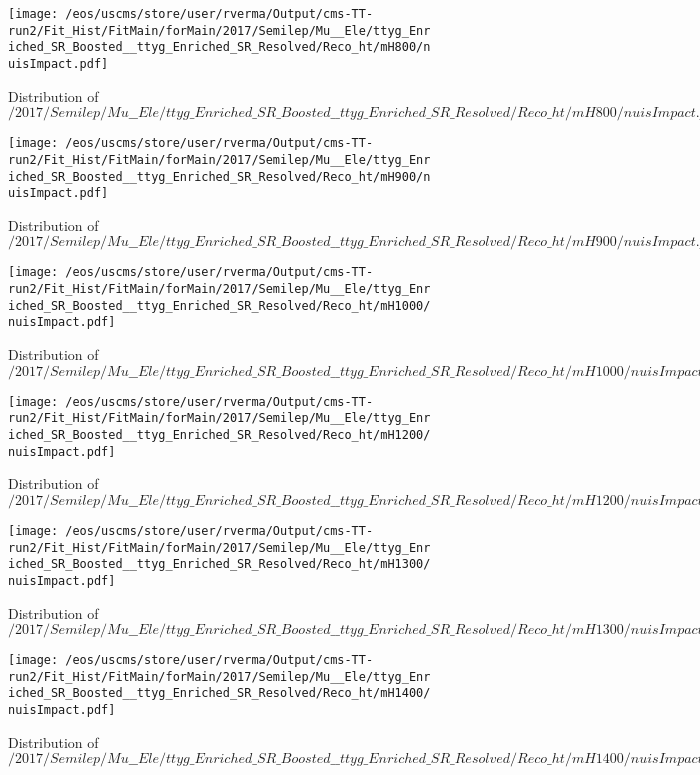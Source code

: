 \begin{figure}
\centering
\texttt{[image: /eos/uscms/store/user/rverma/Output/cms-TT-run2/Fit\_Hist/FitMain/forMain/2017/Semilep/Mu\_\_Ele/ttyg\_Enriched\_SR\_Boosted\_\_ttyg\_Enriched\_SR\_Resolved/Reco\_ht/mH800/nuisImpact.pdf]}
\caption{Distribution of $/2017/Semilep/Mu\_\_Ele/ttyg\_Enriched\_SR\_Boosted\_\_ttyg\_Enriched\_SR\_Resolved/Reco\_ht/mH800/nuisImpact.pdf$}
\end{figure}

\begin{figure}
\centering
\texttt{[image: /eos/uscms/store/user/rverma/Output/cms-TT-run2/Fit\_Hist/FitMain/forMain/2017/Semilep/Mu\_\_Ele/ttyg\_Enriched\_SR\_Boosted\_\_ttyg\_Enriched\_SR\_Resolved/Reco\_ht/mH900/nuisImpact.pdf]}
\caption{Distribution of $/2017/Semilep/Mu\_\_Ele/ttyg\_Enriched\_SR\_Boosted\_\_ttyg\_Enriched\_SR\_Resolved/Reco\_ht/mH900/nuisImpact.pdf$}
\end{figure}

\begin{figure}
\centering
\texttt{[image: /eos/uscms/store/user/rverma/Output/cms-TT-run2/Fit\_Hist/FitMain/forMain/2017/Semilep/Mu\_\_Ele/ttyg\_Enriched\_SR\_Boosted\_\_ttyg\_Enriched\_SR\_Resolved/Reco\_ht/mH1000/nuisImpact.pdf]}
\caption{Distribution of $/2017/Semilep/Mu\_\_Ele/ttyg\_Enriched\_SR\_Boosted\_\_ttyg\_Enriched\_SR\_Resolved/Reco\_ht/mH1000/nuisImpact.pdf$}
\end{figure}

\begin{figure}
\centering
\texttt{[image: /eos/uscms/store/user/rverma/Output/cms-TT-run2/Fit\_Hist/FitMain/forMain/2017/Semilep/Mu\_\_Ele/ttyg\_Enriched\_SR\_Boosted\_\_ttyg\_Enriched\_SR\_Resolved/Reco\_ht/mH1200/nuisImpact.pdf]}
\caption{Distribution of $/2017/Semilep/Mu\_\_Ele/ttyg\_Enriched\_SR\_Boosted\_\_ttyg\_Enriched\_SR\_Resolved/Reco\_ht/mH1200/nuisImpact.pdf$}
\end{figure}

\begin{figure}
\centering
\texttt{[image: /eos/uscms/store/user/rverma/Output/cms-TT-run2/Fit\_Hist/FitMain/forMain/2017/Semilep/Mu\_\_Ele/ttyg\_Enriched\_SR\_Boosted\_\_ttyg\_Enriched\_SR\_Resolved/Reco\_ht/mH1300/nuisImpact.pdf]}
\caption{Distribution of $/2017/Semilep/Mu\_\_Ele/ttyg\_Enriched\_SR\_Boosted\_\_ttyg\_Enriched\_SR\_Resolved/Reco\_ht/mH1300/nuisImpact.pdf$}
\end{figure}

\begin{figure}
\centering
\texttt{[image: /eos/uscms/store/user/rverma/Output/cms-TT-run2/Fit\_Hist/FitMain/forMain/2017/Semilep/Mu\_\_Ele/ttyg\_Enriched\_SR\_Boosted\_\_ttyg\_Enriched\_SR\_Resolved/Reco\_ht/mH1400/nuisImpact.pdf]}
\caption{Distribution of $/2017/Semilep/Mu\_\_Ele/ttyg\_Enriched\_SR\_Boosted\_\_ttyg\_Enriched\_SR\_Resolved/Reco\_ht/mH1400/nuisImpact.pdf$}
\end{figure}

